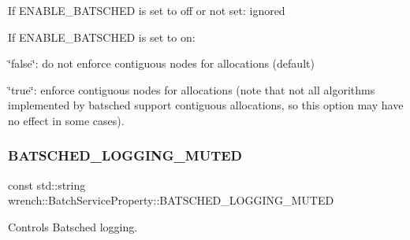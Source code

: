 \begin{DoxyItemize}
\item If E\+N\+A\+B\+L\+E\+\_\+\+B\+A\+T\+S\+C\+H\+ED is set to off or not set\+: ignored
\item If E\+N\+A\+B\+L\+E\+\_\+\+B\+A\+T\+S\+C\+H\+ED is set to on\+:
\begin{DoxyItemize}
\item \char`\"{}false\char`\"{}\+: do not enforce contiguous nodes for allocations (default)
\item \char`\"{}true\char`\"{}\+: enforce contiguous nodes for allocations (note that not all algorithms implemented by batsched support contiguous allocations, so this option may have no effect in some cases). 
\end{DoxyItemize}
\end{DoxyItemize}\mbox{\label{classwrench_1_1_batch_service_property_aaab42384419440aacdbaac79e3346bf1}} 
\subsubsection{\texorpdfstring{B\+A\+T\+S\+C\+H\+E\+D\+\_\+\+L\+O\+G\+G\+I\+N\+G\+\_\+\+M\+U\+T\+ED}{BATSCHED\_LOGGING\_MUTED}}
{\footnotesize\ttfamily const std\+::string wrench\+::\+Batch\+Service\+Property\+::\+B\+A\+T\+S\+C\+H\+E\+D\+\_\+\+L\+O\+G\+G\+I\+N\+G\+\_\+\+M\+U\+T\+ED\hspace{0.3cm}{\ttfamily [static]}}



Controls Batsched logging. 


